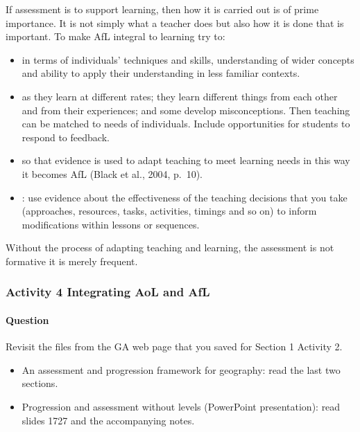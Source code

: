 \documentclass[letterpaper,10pt,english]{sphinxmanual}
\begin{document}
If assessment is to support learning, then how it is carried out is of prime importance. It is not simply what a teacher does but also how it is done that is important. To make AfL integral to learning try to:
\begin{itemize}
\item {} 
 in terms of individuals’ techniques and skills, understanding of wider concepts and ability to apply their understanding in less familiar contexts.

\item {} 
 as they learn at different rates; they learn different things from each other and from their experiences; and some develop misconceptions. Then teaching can be matched to needs of individuals. Include opportunities for students to respond to feedback.

\item {} 
 so that evidence is used to adapt teaching to meet learning needs \textendash{} in this way it becomes AfL (Black et al., 2004, p. 10).

\item {} 
: use evidence about the effectiveness of the teaching decisions that you take (approaches, resources, tasks, activities, timings and so on) to inform modifications within lessons or sequences.

\end{itemize}

Without the process of adapting teaching and learning, the assessment is not formative \textendash{} it is merely frequent.


\subsubsection{Activity 4 Integrating AoL and AfL}
\label{\detokenize{content/session_00/Part_00_02:Activity-4-Integrating-AoL-and-AfL}}


\paragraph{Question}
\label{\detokenize{content/session_00/Part_00_02:id3}}
Revisit the files from the GA web page that you saved for Section 1 Activity 2.
\begin{itemize}
\item {} 
An assessment and progression framework for geography: read the last two sections.

\item {} 
Progression and assessment without levels (PowerPoint presentation): read slides 17\textendash{}27 and the accompanying notes.

\end{itemize}
\end{document}

